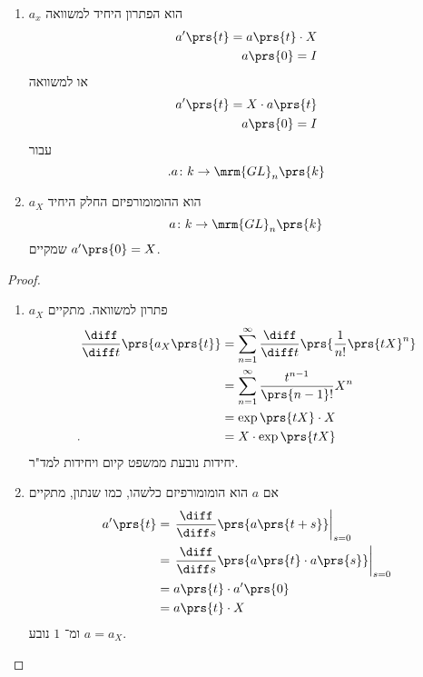 \documentclass[10pt, twoside]{book}
\begin{document}
\begin{proposition}
\begin{enumerate}
\item $a_x$ הוא הפתרון היחיד למשוואה
\begin{align*}
a'\prs{t} = a\prs{t} \cdot X \\
a\prs{0} = I
\end{align*}
או למשוואה
\begin{align*}
a'\prs{t} = X \cdot a\prs{t} \\
a\prs{0} = I
\end{align*}
עבור
\[ \text{.} a \colon k \to \mrm{GL}_n\prs{k}\]

\item 
$a_X$
הוא ההומומורפיזם החלק היחיד
\[a \colon k \to \mrm{GL}_n\prs{k}\]
שמקיים
$a'\prs{0} = X$.
\end{enumerate}
\end{proposition}

\begin{proof}
\begin{enumerate}
\item $a_X$
פתרון למשוואה. מתקיים
\begin{align*}
\frac{\diff}{\diff t}\prs{a_X\prs{t}} &= \sum_{n=1}^\infty \frac{\diff}{\diff t} \prs{\frac{1}{n!} \prs{tX}^n}
\\&=
\sum_{n=1}^{\infty} \frac{t^{n-1}}{\prs{n-1}!} X^n
\\ &=
\exp\prs{tX} \cdot X
\\ \text{.} \hphantom{\frac{\diff}{\diff t}\prs{a_X\prs{t}}} &=
X \cdot \exp\prs{tX}
\end{align*}
יחידות נובעת ממשפט קיום ויחידות למד"ר.

\item אם
$a$
הוא הומומורפיזם כלשהו, כמו שנתון, מתקיים
\begin{align*}
a'\prs{t} &= \left. \frac{\diff}{\diff s} \prs{a\prs{t+s}} \right|_{s=0}
\\&=
\left. \frac{\diff}{\diff s}\prs{a \prs{t} \cdot a\prs{s}} \right|_{s=0}
\\&=
a\prs{t} \cdot a'\prs{0}
\\&=
a\prs{t} \cdot X
\end{align*}
ומ־%
$1$
נובע
$a = a_X$.
\end{enumerate}
\end{proof}


\end{document}
